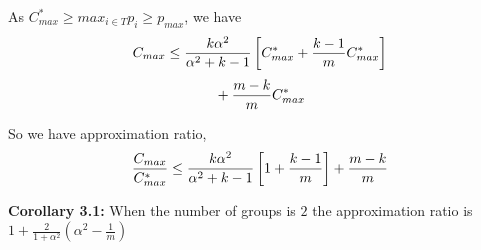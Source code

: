 \documentclass[10pt, conference, compsocconf]{IEEEtran}
\begin{document}
 As $C_{max}^{*}\geq {{max_{i \in T}}{p_{i}}}\geq p_{max}$, we have
\begin{equation}{\nonumber}
 C_{max} \leq \frac{k\alpha^{2}}{\alpha^{2}+k-1}\left[ C_{max}^{*}+ {\frac{k-1}{m}}{C_{max}^{*}}\right] 
  \end{equation}
 \begin{equation}{\nonumber}
   + {\frac{m-k}{m}} C_{max}^{*} 
   \end{equation} 
 
 So we have approximation ratio,
 \begin{equation}{\nonumber}
\frac{C_{max}}{C_{max}^{*}} \leq \frac{k\alpha^{2}}{\alpha^{2}+k-1}\left[1+ {\frac{k-1}{m}} \right]+ {\frac{m-k}{m}} \end{equation}



\textbf{Corollary 3.1:} When the number of groups is $2$ the approximation ratio is $ 1+ \frac{2}{1+\alpha^{2}} (\alpha^2-\frac{1}{m})  $ \\







%
%

\end{document}
